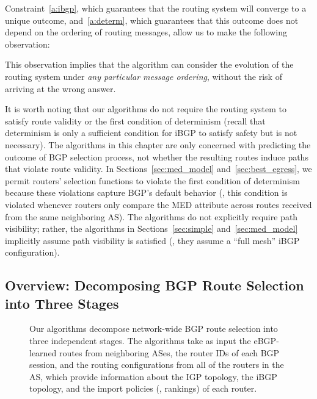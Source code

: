 Constraint~\ref{a:ibgp}, which guarantees that the routing system will
converge to a unique outcome, and~\ref{a:determ}, which guarantees that
this outcome does not depend on the ordering of routing messages, allow
us to make the following observation:

\vspace{0.15in}
\begin{center}
\end{center}
\vspace*{0.1in}
\noindent
This observation implies that the algorithm can consider the evolution
of the routing system under {\em any particular message ordering},
without the risk of arriving at the wrong answer.


It is worth noting that our algorithms do not require the routing system
to satisfy route validity or the first condition of determinism (recall
that determinism is only a sufficient condition for iBGP to satisfy
safety but is not necessary).  The algorithms in this chapter are only
concerned with predicting the outcome of BGP selection process, not
whether the resulting routes induce paths that violate route validity.  In
Sections~\ref{sec:med_model} and~\ref{sec:best_egress}, we permit
routers' selection functions to violate the first condition of
determinism because these violations capture BGP's default behavior
(\ie, this condition is violated whenever routers only compare the MED
attribute across routes received from the same neighboring AS).  The
algorithms do not explicitly require path visibility; rather, the
algorithms in
Sections~\ref{sec:simple} and~\ref{sec:med_model} implicitly assume path
visibility is satisfied (\ie, they assume a ``full mesh'' iBGP
configuration).

\subsection{Overview: Decomposing BGP Route Selection into Three
  Stages}\label{sec:decompose} 

\begin{figure*}
\centering{}
\caption[Decomposing BGP route selection into three
  independent stages.]{Our algorithms decompose network-wide BGP route
  selection into three independent stages.  The algorithms take as input
  the eBGP-learned routes from neighboring ASes, the router IDs of each
  BGP session, and the routing configurations from all of the routers in
  the AS, which provide information about the IGP topology, the iBGP
  topology, and the import policies (\ie, rankings) of each router.}
\label{fig:modules}
\end{figure*}

